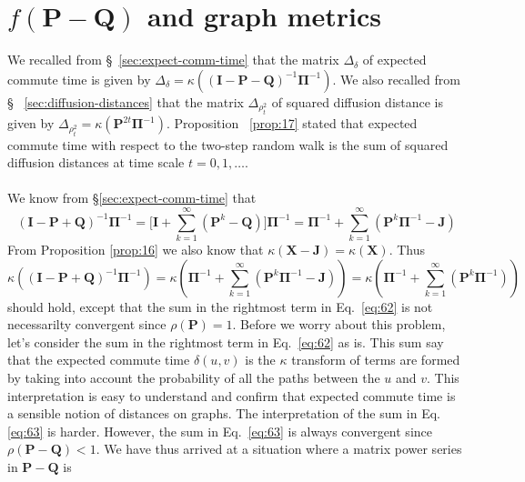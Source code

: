 \section{$f(\mathbf{P} - \mathbf{Q})$ and graph metrics}
\label{sec:graph-metr-funct}
We recalled from \S ~\ref{sec:expect-comm-time} that the matrix
$\Delta_{\delta}$ of expected commute time is given by
$\Delta_{\delta} = \kappa((\mathbf{I} - \mathbf{P} -
\mathbf{Q})^{-1}\bm{\Pi}^{-1})$. We also recalled from \S
~\ref{sec:diffusion-distances} that the matrix $\Delta_{\rho_{t}^{2}}$
of squared diffusion distance is given by $\Delta_{\rho_{t}^{2}} =
\kappa(\mathbf{P}^{2t}\bm{\Pi}^{-1})$. Proposition ~\ref{prop:17}
stated that expected commute time with respect to the two-step random
walk is the sum of squared diffusion distances at time scale
$t=0,1,\dots$. \\
\\
\noindent
We know from \S \ref{sec:expect-comm-time} that
\begin{equation}
\label{eq:63}
  (\mathbf{I} - \mathbf{P} + \mathbf{Q})^{-1}\bm{\Pi}^{-1} =
\biggl[\mathbf{I} +
  \sum_{k=1}^{\infty}{(\mathbf{P}^{k} -
    \mathbf{Q})}\biggr]\bm{\Pi}^{-1} = \bm{\Pi}^{-1} +
  \sum_{k=1}^{\infty}{(\mathbf{P}^{k}\bm{\Pi}^{-1} - \mathbf{J})}
\end{equation}
From Proposition \ref{prop:16} we also know that $\kappa(\mathbf{X} -
\mathbf{J}) = \kappa(\mathbf{X})$. Thus
\begin{equation}
  \label{eq:62}
  \kappa((\mathbf{I} - \mathbf{P} + \mathbf{Q})^{-1}\bm{\Pi}^{-1}) = \kappa(\bm{\Pi}^{-1} +
  \sum_{k=1}^{\infty}{(\mathbf{P}^{k}\bm{\Pi}^{-1} - \mathbf{J})}) =
  \kappa(\bm{\Pi}^{-1} + \sum_{k=1}^{\infty}{(\mathbf{P}^{k}\bm{\Pi}^{-1})})
\end{equation}
should hold, except that the sum in the rightmost term in
Eq.~\eqref{eq:62} is not necessarilty convergent since
$\rho(\mathbf{P}) = 1$. Before we worry about this problem, let's
consider the sum in the rightmost term in Eq.~\eqref{eq:62} as is. This sum
say that the expected commute time $\delta(u,v)$ is the
$\kappa$ transform of terms are formed by taking into account the
probability of all the paths between the $u$ and $v$. This
interpretation is easy to understand and confirm that
expected commute time is a sensible notion of distances on graphs. The
interpretation of the sum in Eq. \eqref{eq:63} is harder.  However,
the sum in Eq.~\eqref{eq:63} is always convergent since
$\rho(\mathbf{P} - \mathbf{Q}) < 1$. We have thus arrived at a
situation where a matrix power series in $\mathbf{P} - \mathbf{Q}$ is
